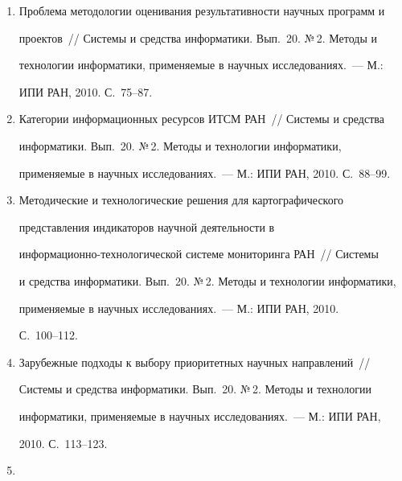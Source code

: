 \begin{enumerate}[1.]
системах информационного мониторинга~/\!\!/ Сис\-те\-мы и средства 


информатики. Вып.~20. №\,2. Методы и технологии информатики, 


применяемые в научных исследованиях.~--- М.: ИПИ РАН, 2010. С.~64--74.


\item {}


Проблема методологии оценивания результативности научных программ и 


проектов~/\!\!/ Сис\-те\-мы и средства информатики. Вып.~20. №\,2. Методы и 


технологии информатики, применяемые в научных исследованиях.~--- М.: 


ИПИ РАН, 2010. С.~75--87.


\item {}


Категории информационных ресурсов ИТСМ РАН~/\!\!/ Сис\-те\-мы и средства 


информатики. Вып.~20. №\,2. Методы и технологии информатики, 


применяемые в научных исследованиях.~--- М.: ИПИ РАН, 2010. С.~88--99.


\item {}


Методические и технологические решения для картографического 


представления индикаторов научной деятельности в 


информационно-тех\-но\-ло\-гической системе мониторинга РАН~/\!\!/ Сис\-те\-мы 


и средства информатики. Вып.~20. №\,2. Методы и технологии информатики, 


применяемые в научных исследованиях.~--- М.: ИПИ РАН, 2010. 


С.~100--112.


\item {}


Зарубежные подходы к выбору приоритетных научных направлений~/\!\!/ 


Сис\-те\-мы и средства информатики. Вып.~20. №\,2. Методы и технологии 


информатики, применяемые в научных исследованиях.~--- М.: ИПИ РАН, 


2010. С.~113--123.


\item {}



\end{enumerate}

